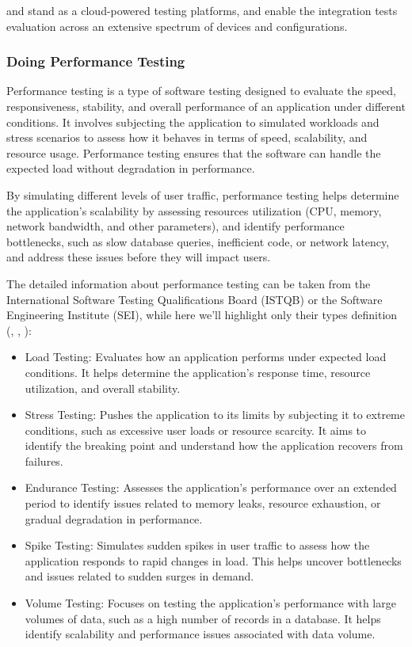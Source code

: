 and  stand as a cloud-powered testing platforms, and enable the integration tests
evaluation across an extensive spectrum of devices and configurations.


\subsubsection{Doing Performance Testing}

Performance testing is a type of software testing designed to evaluate the speed, responsiveness, stability, and 
overall performance of an application under different conditions. It involves subjecting the application to 
simulated workloads and stress scenarios to assess how it behaves in terms of speed, scalability, and resource usage. 
Performance testing ensures that the software can handle the expected load without degradation in performance.

By simulating different levels of user traffic, performance testing helps determine the application's scalability by
assessing resources utilization (CPU, memory, network bandwidth, and other parameters), and identify performance 
bottlenecks, such as slow database queries, inefficient code, or network latency, and address these issues before 
they will impact users.

The detailed information about performance testing can be taken from the International Software Testing Qualifications 
Board (ISTQB) or the Software Engineering Institute (SEI), while here we'll highlight only their types definition 
(\cite{Ian15}, \cite{Sag16}, \cite{Sag23}):
\begin{itemize}
  \item Load Testing: Evaluates how an application performs under expected load conditions. It helps determine the 
  application's response time, resource utilization, and overall stability.

  \item Stress Testing: Pushes the application to its limits by subjecting it to extreme conditions, such as excessive 
  user loads or resource scarcity. It aims to identify the breaking point and understand how the application recovers 
  from failures.

  \item Endurance Testing: Assesses the application's performance over an extended period to identify issues related to 
  memory leaks, resource exhaustion, or gradual degradation in performance.

  \item Spike Testing: Simulates sudden spikes in user traffic to assess how the application responds to rapid changes
  in load. This helps uncover bottlenecks and issues related to sudden surges in demand.

  \item Volume Testing: Focuses on testing the application's performance with large volumes of data, such as a high 
  number of records in a database. It helps identify scalability and performance issues associated with data volume.
\end{itemize}

